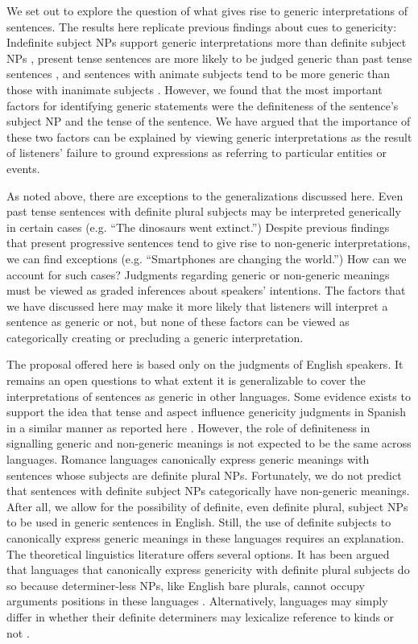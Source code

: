 \documentclass[10pt,letterpaper]{article}
\begin{document}
We set out to explore the question of what gives rise to generic interpretations of sentences. The results here replicate previous findings about cues to genericity: Indefinite subject NPs support generic interpretations more than definite subject NPs \cite{Cimpian:2011, Gelman:2003}, present tense sentences are more likely to be judged generic than past tense sentences \cite{Cimpian:2011}, and sentences with animate subjects tend to be more generic than those with inanimate subjects \cite{Brandone:2009}. However, we found that the most important factors for identifying generic statements were the definiteness of the sentence's subject NP and the tense of the sentence. We have argued that the importance of these two factors can be explained by viewing generic interpretations as the result of listeners' failure to ground expressions as referring to particular entities or events.

As noted above, there are exceptions to the generalizations discussed here. Even past tense sentences with definite plural subjects may be interpreted generically in certain cases (e.g. ``The dinosaurs went extinct.'') Despite previous findings that present progressive sentences tend to give rise to non-generic interpretations, we can find exceptions (e.g. ``Smartphones are changing the world.'') How can we account for such cases? Judgments regarding generic or non-generic meanings must be viewed as graded inferences about speakers' intentions. The factors that we have discussed here may make it more likely that listeners will interpret a sentence as generic or not, but none of these factors can be viewed as categorically creating or precluding a generic interpretation.

The proposal offered here is based only on the judgments of English speakers. It remains an open questions to what extent it is generalizable to cover the interpretations of sentences as generic in other languages. Some evidence exists to support the idea that tense and aspect influence genericity judgments in Spanish in a similar manner as reported here \cite{Perez-Leroux:2004}. However, the role of definiteness in signalling generic and non-generic meanings is not expected to be the same across languages. Romance languages canonically express generic meanings with sentences whose subjects are definite plural NPs. Fortunately, we do not predict that sentences with definite subject NPs categorically have non-generic meanings. After all, we allow for the possibility of definite, even definite plural, subject NPs to be used in generic sentences in English. Still, the use of definite subjects to canonically express generic meanings in these languages requires an explanation. The theoretical linguistics literature offers several options. It has been argued that languages that canonically express genericity with definite plural subjects do so because determiner-less NPs, like English bare plurals, cannot occupy arguments positions in these languages \cite{Chierchia:1998}. Alternatively, languages may simply differ in whether their definite determiners may lexicalize reference to kinds or not \cite{Dayal:2004}.
\end{document}

